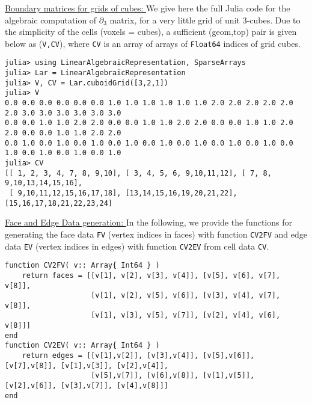\vspace{10pt}
\noindent\underline{
Boundary matrices for grids of cubes:
}\vspace{0.2em}\newline 
We give here the full Julia code for the algebraic computation of $\partial_3$ matrix, for a very little grid of unit
3-cubes. Due to the simplicity of the cells (voxels = cubes), a sufficient (geom,top) pair is given below
as (\texttt{V,CV}), where \texttt{CV} is an array of arrays of \texttt{Float64} indices of grid cubes.

\begin{Verbatim}[fontsize=\footnotesize]
julia> using LinearAlgebraicRepresentation, SparseArrays
julia> Lar = LinearAlgebraicRepresentation
julia> V, CV = Lar.cuboidGrid([3,2,1])
julia> V
0.0 0.0 0.0 0.0 0.0 0.0 1.0 1.0 1.0 1.0 1.0 1.0 2.0 2.0 2.0 2.0 2.0 2.0 3.0 3.0 3.0 3.0 3.0 3.0
0.0 0.0 1.0 1.0 2.0 2.0 0.0 0.0 1.0 1.0 2.0 2.0 0.0 0.0 1.0 1.0 2.0 2.0 0.0 0.0 1.0 1.0 2.0 2.0
0.0 1.0 0.0 1.0 0.0 1.0 0.0 1.0 0.0 1.0 0.0 1.0 0.0 1.0 0.0 1.0 0.0 1.0 0.0 1.0 0.0 1.0 0.0 1.0
julia> CV
[[ 1, 2, 3, 4, 7, 8, 9,10], [ 3, 4, 5, 6, 9,10,11,12], [ 7, 8, 9,10,13,14,15,16],
 [ 9,10,11,12,15,16,17,18], [13,14,15,16,19,20,21,22], [15,16,17,18,21,22,23,24]
\end{Verbatim}

\vspace{10pt}
\noindent\underline{
Face and Edge Data generation:
}\vspace{0.2em}\newline 
In the following, we provide the functions for generating the face data \texttt{FV} (vertex indices in faces) with function  \texttt{CV2FV} and edge data \texttt{EV} (vertex indices in edges) with function \texttt{CV2EV} from cell data \texttt{CV}. 



\begin{Verbatim}[fontsize=\footnotesize]
function CV2FV( v:: Array{ Int64 } )
    return faces = [[v[1], v[2], v[3], v[4]], [v[5], v[6], v[7], v[8]],
                    [v[1], v[2], v[5], v[6]], [v[3], v[4], v[7], v[8]],
                    [v[1], v[3], v[5], v[7]], [v[2], v[4], v[6], v[8]]]
end
function CV2EV( v:: Array{ Int64 } )
    return edges = [[v[1],v[2]], [v[3],v[4]], [v[5],v[6]], [v[7],v[8]], [v[1],v[3]], [v[2],v[4]],
                    [v[5],v[7]], [v[6],v[8]], [v[1],v[5]], [v[2],v[6]], [v[3],v[7]], [v[4],v[8]]]
end
\end{Verbatim}


